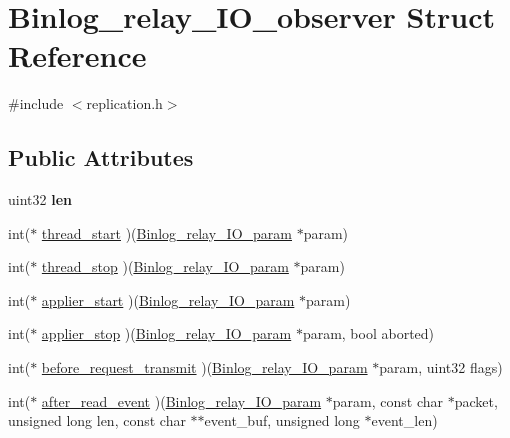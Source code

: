 \hypertarget{structBinlog__relay__IO__observer}{}\section{Binlog\+\_\+relay\+\_\+\+I\+O\+\_\+observer Struct Reference}
\label{structBinlog__relay__IO__observer}


{\ttfamily \#include $<$replication.\+h$>$}

\subsection*{Public Attributes}
\begin{DoxyCompactItemize}
\item 
\mbox{\label{structBinlog__relay__IO__observer_abb607f2709f74085c6714dde0c89a39c}} 
uint32 {\bfseries len}
\item 
int($\ast$ \mbox{\hyperlink{structBinlog__relay__IO__observer_a20289ee51edcf183545e10dabd64cf6e}{thread\+\_\+start}} )(\mbox{\hyperlink{structBinlog__relay__IO__param}{Binlog\+\_\+relay\+\_\+\+I\+O\+\_\+param}} $\ast$param)
\item 
int($\ast$ \mbox{\hyperlink{structBinlog__relay__IO__observer_a294cb8458058381e4721a3a1ae3611e9}{thread\+\_\+stop}} )(\mbox{\hyperlink{structBinlog__relay__IO__param}{Binlog\+\_\+relay\+\_\+\+I\+O\+\_\+param}} $\ast$param)
\item 
int($\ast$ \mbox{\hyperlink{structBinlog__relay__IO__observer_ae91b0642ab8e0ce148caf48ab0576d40}{applier\+\_\+start}} )(\mbox{\hyperlink{structBinlog__relay__IO__param}{Binlog\+\_\+relay\+\_\+\+I\+O\+\_\+param}} $\ast$param)
\item 
int($\ast$ \mbox{\hyperlink{structBinlog__relay__IO__observer_ac4ddb05e11e8315086b8be4a0141a369}{applier\+\_\+stop}} )(\mbox{\hyperlink{structBinlog__relay__IO__param}{Binlog\+\_\+relay\+\_\+\+I\+O\+\_\+param}} $\ast$param, bool aborted)
\item 
int($\ast$ \mbox{\hyperlink{structBinlog__relay__IO__observer_af77e9d19d035a32f44167c54047c7e59}{before\+\_\+request\+\_\+transmit}} )(\mbox{\hyperlink{structBinlog__relay__IO__param}{Binlog\+\_\+relay\+\_\+\+I\+O\+\_\+param}} $\ast$param, uint32 flags)
\item 
int($\ast$ \mbox{\hyperlink{structBinlog__relay__IO__observer_a27807e0980172eea877fd8aae424ac1f}{after\+\_\+read\+\_\+event}} )(\mbox{\hyperlink{structBinlog__relay__IO__param}{Binlog\+\_\+relay\+\_\+\+I\+O\+\_\+param}} $\ast$param, const char $\ast$packet, unsigned long len, const char $\ast$$\ast$event\+\_\+buf, unsigned long $\ast$event\+\_\+len)
$$
\end{DoxyCompactItemize}
